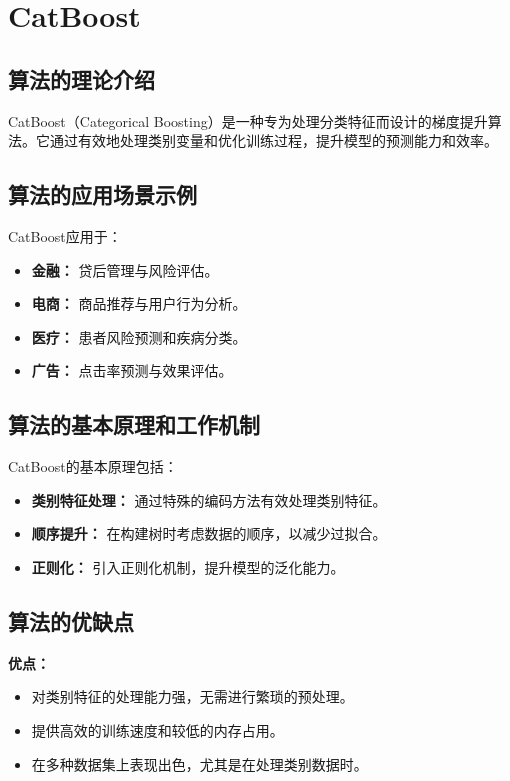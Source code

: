 \section{CatBoost}
\subsection*{算法的理论介绍}
CatBoost（Categorical Boosting）是一种专为处理分类特征而设计的梯度提升算法。它通过有效地处理类别变量和优化训练过程，提升模型的预测能力和效率。

\subsection*{算法的应用场景示例}
CatBoost应用于：
\begin{itemize}
    \item \textbf{金融：} 贷后管理与风险评估。
    \item \textbf{电商：} 商品推荐与用户行为分析。
    \item \textbf{医疗：} 患者风险预测和疾病分类。
    \item \textbf{广告：} 点击率预测与效果评估。
\end{itemize}

\subsection*{算法的基本原理和工作机制}
CatBoost的基本原理包括：
\begin{itemize}
    \item \textbf{类别特征处理：} 通过特殊的编码方法有效处理类别特征。
    \item \textbf{顺序提升：} 在构建树时考虑数据的顺序，以减少过拟合。
    \item \textbf{正则化：} 引入正则化机制，提升模型的泛化能力。
\end{itemize}

\subsection*{算法的优缺点}
\textbf{优点：}
\begin{itemize}
    \item 对类别特征的处理能力强，无需进行繁琐的预处理。
    \item 提供高效的训练速度和较低的内存占用。
    \item 在多种数据集上表现出色，尤其是在处理类别数据时。
\end{itemize}

